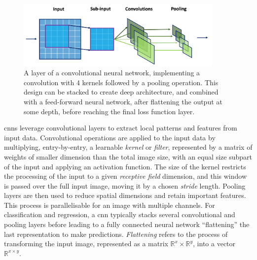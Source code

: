 \begin{figure}[h!]
    \center
    \includegraphics[width=0.9\textwidth]{Images/ML/cnn.png}
    \caption{A layer of a convolutional neural network, implementing a convolution with 4 kernels followed by a pooling operation. This design can be stacked to create deep architecture, and combined with a feed-forward neural network, after flattening the output at some depth, before reaching the final loss function layer.} 
    \label{fig:cnnDesign}
\end{figure}

\glspl{cnn} leverage convolutional layers to extract local patterns and features from input data. Convolutional operations are applied to the input data by multiplying, entry-by-entry, a learnable \textit{kernel} or \textit{filter}, represented by a matrix of weights of smaller dimension than the total image size, with an equal size subpart of the input and applying an activation function. The size of the kernel restricts the processing of the input to a given \textit{receptive field} dimension, and this window is passed over the full input image, moving it by a chosen \textit{stride} length. Pooling layers are then used to reduce spatial dimensions and retain important features. This process is parallelisable for an image with multiple channels. For classification and regression, a \gls{cnn} typically stacks several convolutional and pooling layers before leading to a fully connected neural network ``flattening'' the last representation to make predictions. \textit{Flattening} refers to the process of transforming the input image, represented as a matrix $\mathbb{R}^{x} \times \mathbb{R}^{y}$, into a vector $\mathbb{R}^{x \times y}$. \\

